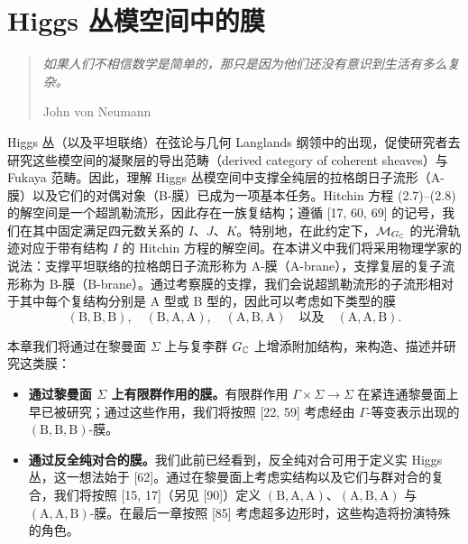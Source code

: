 
\section{Higgs 丛模空间中的膜}

\begin{quote}
\itshape 如果人们不相信数学是简单的，那只是因为他们还没有意识到生活有多么复杂。

\normalfont\begin{flushright}
John von Neumann
\end{flushright}
\end{quote}

Higgs 丛（以及平坦联络）在弦论与几何 Langlands 纲领中的出现，促使研究者去研究这些模空间的凝聚层的导出范畴（derived category of coherent sheaves）与 Fukaya 范畴。因此，理解 Higgs 丛模空间中支撑全纯层的拉格朗日子流形（A-膜）以及它们的对偶对象（B-膜）已成为一项基本任务。Hitchin 方程 (2.7)--(2.8) 的解空间是一个超凯勒流形，因此存在一族复结构；遵循 [17, 60, 69] 的记号，我们在其中固定满足四元数关系的 $I$、$J$、$K$。特别地，在此约定下，$\mathcal{M}_{G_{\mathbb{C}}}$ 的光滑轨迹对应于带有结构 $I$ 的 Hitchin 方程的解空间。在本讲义中我们将采用物理学家的说法：支撑平坦联络的拉格朗日子流形称为 A-膜（A-brane），支撑复层的复子流形称为 B-膜（B-brane）。通过考察膜的支撑，我们会说超凯勒流形的子流形相对于其中每个复结构分别是 A 型或 B 型的，因此可以考虑如下类型的膜
\[
(\mathrm{B},\mathrm{B},\mathrm{B}),\quad (\mathrm{B},\mathrm{A},\mathrm{A}),\quad (\mathrm{A},\mathrm{B},\mathrm{A})\quad\text{以及}\quad(\mathrm{A},\mathrm{A},\mathrm{B}).
\]



本章我们将通过在黎曼面 $\Sigma$ 上与复李群 $G_{\mathbb{C}}$ 上增添附加结构，来构造、描述并研究这类膜：

\begin{itemize}[leftmargin=1.4em,itemsep=1pt,topsep=1pt]
\item \textbf{通过黎曼面 $\Sigma$ 上有限群作用的膜。}有限群作用 $\Gamma\times\Sigma\to\Sigma$ 在紧连通黎曼面上早已被研究；通过这些作用，我们将按照 [22, 59] 考虑经由 $\Gamma$-等变表示出现的 $(\mathrm{B},\mathrm{B},\mathrm{B})$-膜。
\item \textbf{通过反全纯对合的膜。}我们此前已经看到，反全纯对合可用于定义实 Higgs 丛，这一想法始于 [62]。通过在黎曼面上考虑实结构以及它们与群对合的复合，我们将按照 [15, 17]（另见 [90]）定义 $(\mathrm{B},\mathrm{A},\mathrm{A})$、$(\mathrm{A},\mathrm{B},\mathrm{A})$ 与 $(\mathrm{A},\mathrm{A},\mathrm{B})$-膜。在最后一章按照 [85] 考虑超多边形时，这些构造将扮演特殊的角色。
\end{itemize}

